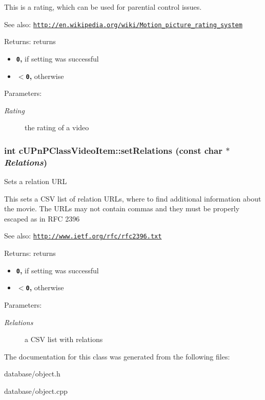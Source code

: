 This is a rating, which can be used for parential control issues.

\begin{Desc}
\item[See also:]\href{http://en.wikipedia.org/wiki/Motion_picture_rating_system}{\tt http://en.wikipedia.org/wiki/Motion\_\-picture\_\-rating\_\-system} \end{Desc}
\begin{Desc}
\item[Returns:]returns\begin{itemize}
\item {\bf {\tt 0},} if setting was successful\item {\bf {\tt $<$0},} otherwise \end{itemize}
\end{Desc}
\begin{Desc}
\item[Parameters:]
\begin{description}
\item[{\em Rating}]the rating of a video \end{description}
\end{Desc}
\hypertarget{classcUPnPClassVideoItem_844385c5fb4f55c95a2994c7aaf120ef}{
\subsubsection[{setRelations}]{\setlength{\rightskip}{0pt plus 5cm}int cUPnPClassVideoItem::setRelations (const char $\ast$ {\em Relations})}}
\label{classcUPnPClassVideoItem_844385c5fb4f55c95a2994c7aaf120ef}


Sets a relation URL

This sets a CSV list of relation URLs, where to find additional information about the movie. The URLs may not contain commas and they must be properly escaped as in RFC 2396

\begin{Desc}
\item[See also:]\href{http://www.ietf.org/rfc/rfc2396.txt}{\tt http://www.ietf.org/rfc/rfc2396.txt} \end{Desc}
\begin{Desc}
\item[Returns:]returns\begin{itemize}
\item {\bf {\tt 0},} if setting was successful\item {\bf {\tt $<$0},} otherwise \end{itemize}
\end{Desc}
\begin{Desc}
\item[Parameters:]
\begin{description}
\item[{\em Relations}]a CSV list with relations \end{description}
\end{Desc}


The documentation for this class was generated from the following files:\begin{CompactItemize}
\item 
database/object.h\item 
database/object.cpp\end{CompactItemize}
